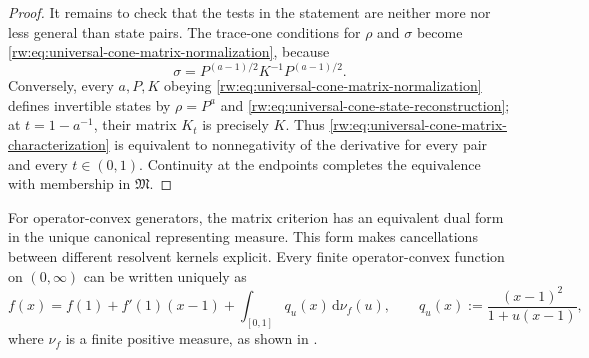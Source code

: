 \documentclass[11pt]{article}
\theoremstyle{remark}
\newcommand{\1}{\mathbbm{1}}
\begin{document}
\begin{proof}
It remains to check that the tests in the statement are neither more
nor less general than state pairs.  The trace-one conditions for
\(\rho\) and \(\sigma\) become
\eqref{rw:eq:universal-cone-matrix-normalization}, because
\begin{equation}
 \sigma=P^{(a-1)/2}K^{-1}P^{(a-1)/2}.
 \label{rw:eq:universal-cone-state-reconstruction}
\end{equation}
Conversely, every \(a,P,K\) obeying
\eqref{rw:eq:universal-cone-matrix-normalization} defines invertible
states by \(\rho=P^a\) and
\eqref{rw:eq:universal-cone-state-reconstruction}; at
\(t=1-a^{-1}\), their matrix \(K_t\) is precisely \(K\).
Thus \eqref{rw:eq:universal-cone-matrix-characterization} is
equivalent to nonnegativity of the derivative for every pair and every
\(t\in(0,1)\).  Continuity at the endpoints completes the
equivalence with membership in \(\mathfrak M\).
\end{proof}

For operator-convex generators, the matrix criterion has an equivalent
dual form in the unique canonical representing measure.  This form
makes cancellations between different resolvent kernels explicit.
Every finite operator-convex function on \((0,\infty)\) can be written
uniquely as
\begin{equation}
 f(x)=f(1)+f'(1)(x-1)
 +\int_{[0,1]}q_u(x)\,\mathrm d\nu_f(u),
 \qquad
 q_u(x):=\frac{(x-1)^2}{1+u(x-1)},
 \label{rw:eq:universal-cone-compact-representation}
\end{equation}
where \(\nu_f\) is a finite positive measure, as shown in
\cite[Theorem~8.1]{hiai2011quantum}.
\end{document}
